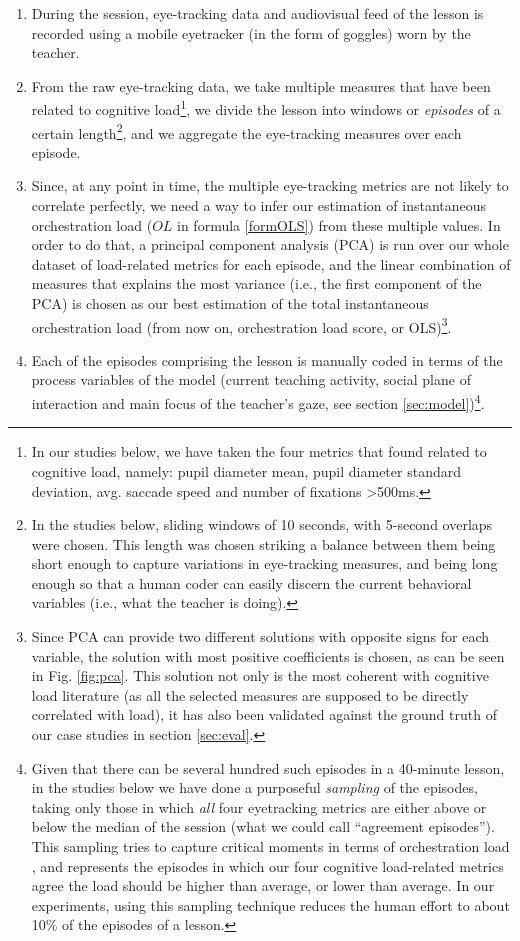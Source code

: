 \documentclass[10pt,journal,compsoc]{IEEEtran}
\begin{document}
\begin{enumerate}
\item During the session, eye-tracking data and audiovisual feed of the lesson is recorded using a mobile eyetracker (in the form of goggles) worn by the teacher.
\item From the raw eye-tracking data, we take multiple measures that have been related to cognitive load\footnote{In our studies below, we have taken the four metrics that \cite{Buettner2013} found related to cognitive load, namely: pupil diameter mean, pupil diameter standard deviation, avg. saccade speed and number of fixations >500ms.}, we divide the lesson into windows or \textit{episodes} of a certain length\footnote{In the studies below, sliding windows of 10 seconds, with 5-second overlaps were chosen. This length was chosen striking a balance between them being short enough to capture variations in eye-tracking measures, and being long enough so that a human coder can easily discern the current behavioral variables (i.e., what the teacher is doing).}, and we aggregate the eye-tracking measures over each episode.
\item Since, at any point in time, the multiple eye-tracking metrics are not likely to correlate perfectly, we need a way to infer our estimation of instantaneous orchestration load ($OL$ in formula \ref{formOLS}) from these multiple values. In order to do that, a principal component analysis (PCA) is run over our whole dataset of load-related metrics for each episode, and the linear combination of measures that explains the most variance (i.e., the first component of the PCA) is chosen as our best estimation of the total instantaneous orchestration load (from now on, orchestration load score, or OLS)\footnote{Since PCA can provide two different solutions with opposite signs for each variable, the solution with most positive coefficients is chosen, as can be seen in Fig. \ref{fig:pca}. This solution not only is the most coherent with cognitive load literature (as all the selected measures are supposed to be directly correlated with load), it has also been validated against the ground truth of our case studies in section \ref{sec:eval}.}.
\item Each of the episodes comprising the lesson is manually coded in terms of the process variables of the model (current teaching activity, social plane of interaction and main focus of the teacher's gaze, see section \ref{sec:model})\footnote{Given that there can be several hundred such episodes in a 40-minute lesson, in the studies below we have done a purposeful \textit{sampling} of the episodes, taking only those in which \textit{all} four eyetracking metrics are either above or below the median of the session (what we could call ``agreement episodes''). This sampling tries to capture critical moments in terms of orchestration load \cite{Prieto2014}, and represents the episodes in which our four cognitive load-related metrics agree the load should be higher than average, or lower than average. In our experiments, using this sampling technique reduces the human effort to about 10\% of the episodes of a lesson.}.

\end{enumerate}
\end{document}
